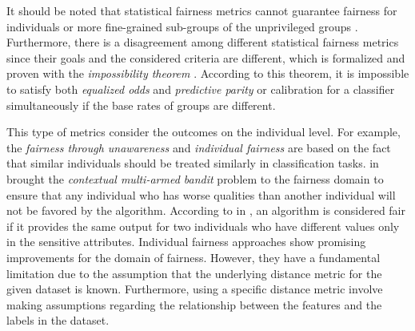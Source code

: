 It should be noted that statistical fairness metrics cannot guarantee fairness for individuals or more fine-grained sub-groups of the unprivileged  groups \cite{chouldechova2018frontiers}. Furthermore, there is a disagreement among different statistical fairness metrics since their goals and the considered criteria are different, which is formalized and proven with the \emph{impossibility theorem} \cite{chouldechova2017fair,kleinberg2017inherent,pleiss2017calibration}. According to this theorem, it is impossible to satisfy both \emph{equalized odds} and  \emph{predictive parity} or calibration for a classifier simultaneously if the base rates of groups are different. 



 This type of metrics consider the outcomes on the individual level. For example, the  \emph{fairness through unawareness} \cite{kusner2017counterfactual} and \emph{individual fairness} \cite{dwork2012fairness} are based on the fact that similar individuals should be treated similarly in classification tasks. \citeauthor{joseph2016fairness_qualified} in  \cite{joseph2016fairness_qualified} brought the \emph{contextual multi-armed bandit} problem to the fairness domain to ensure that any individual who has worse qualities than another individual will not be favored by the algorithm. According to \citeauthor{galhotra2017causal_discr} in \cite{galhotra2017causal_discr}, an algorithm is considered fair if it provides the same output for two individuals who have different values only in the sensitive attributes.
Individual fairness approaches show promising improvements for the domain of fairness. However, they have a fundamental limitation due to the assumption that the underlying distance metric for the given dataset is known. Furthermore, using a specific distance metric involve making assumptions regarding the relationship between the features and the labels in the dataset.

